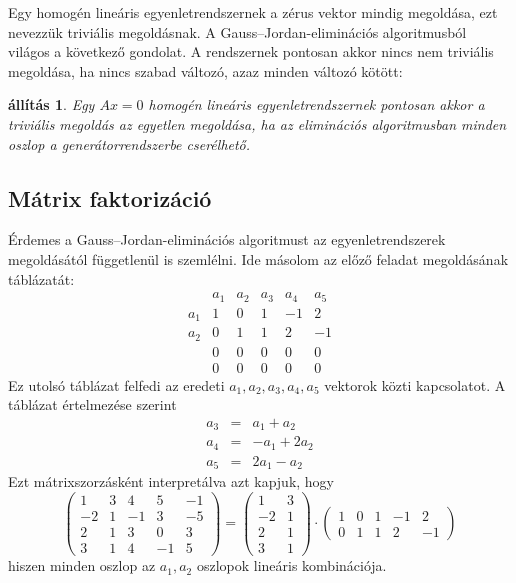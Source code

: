 \documentclass[9pt, a4paper, showtrims]{memoir}
\theoremstyle{plain}
\newtheorem{proposition}{állítás}[chapter]
\theoremstyle{remark}
\theoremstyle{definition}
\begin{document}
Egy homogén lineáris egyenletrendszernek a zérus vektor mindig megoldása,
ezt nevezzük triviális megoldásnak.
A Gauss--Jordan-eliminációs  algoritmusból világos a következő gondolat.
A rendszernek pontosan akkor nincs nem triviális megoldása, 
ha nincs szabad változó, azaz minden változó kötött:
\begin{proposition}
    Egy $Ax=0$ homogén lineáris egyenletrendszernek pontosan akkor a triviális megoldás az egyetlen megoldása, 
    ha az eliminációs algoritmusban minden oszlop a generátorrendszerbe cserélhető.
\end{proposition}
\subsection{Mátrix faktorizáció}
Érdemes a Gauss--Jordan-eliminációs  algoritmust az egyenletrendszerek megoldásától függetlenül is szemlélni.
Ide másolom az előző feladat megoldásának táblázatát:
\[
    \begin{array}{r|rrrrr}
        &a_1&a_2&a_3&a_4&a_5\\
        \hline
        a_1&1&0&1&-1&2\\
        a_2&0&1&1&2&-1\\
        &0&0&0&0&0\\
        &0&0&0&0&0
    \end{array}
\]
Ez utolsó táblázat felfedi az eredeti $a_1,a_2,a_3,a_4,a_5$ vektorok közti kapcsolatot.
A táblázat értelmezése szerint
\begin{eqnarray*}
    a_3&=& a_1+a_2\\
    a_4&=& -a_1+2a_2\\
    a_5&=& 2a_1-a_2
\end{eqnarray*}
Ezt mátrixszorzásként interpretálva azt kapjuk, hogy
\[
    \begin{pmatrix}
        1&3&4&5&-1\\
        -2&1&-1&3&-5\\
        2&1&3&0&3\\
        3&1&4&-1&5
    \end{pmatrix}
    =
    \begin{pmatrix}
        1&3\\
        -2&1\\
        2&1\\
        3&1
    \end{pmatrix}
    \cdot
    \begin{pmatrix}
        1&0&1&-1&2\\
        0&1&1&2&-1
    \end{pmatrix}
\]
hiszen minden oszlop az $a_1,a_2$ oszlopok lineáris kombinációja.
\end{document}
